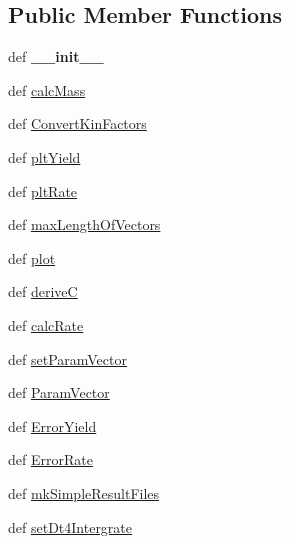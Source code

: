 \subsection*{\-Public \-Member \-Functions}
\begin{DoxyCompactItemize}
\item 
\hypertarget{classModels_1_1ArrheniusModel_aed66810f882bde4a28b94ef527575b4d}{def {\bfseries \-\_\-\-\_\-init\-\_\-\-\_\-}}\label{classModels_1_1ArrheniusModel_aed66810f882bde4a28b94ef527575b4d}

\item 
def \hyperlink{classModels_1_1ArrheniusModel_abb4fedac573a2f263fd5bb4cd284ce65}{calc\-Mass}
\item 
def \hyperlink{classModels_1_1ArrheniusModel_a946e6177077d67613160aaaedde95faa}{\-Convert\-Kin\-Factors}
\item 
def \hyperlink{classModels_1_1Model_a317ed848b969dbe3a96dd05e8b771900}{plt\-Yield}
\item 
def \hyperlink{classModels_1_1Model_aa35c741babf8f141df48c4021e0664e4}{plt\-Rate}
\item 
def \hyperlink{classModels_1_1Model_a3396d6ca1a7b7d66e55ada8c3c7a509e}{max\-Length\-Of\-Vectors}
\item 
def \hyperlink{classModels_1_1Model_ae404a691e48bfe4eafcdfdd09f1dae48}{plot}
\item 
def \hyperlink{classModels_1_1Model_a010945ed2adff59a7a5fce36025e7a97}{derive\-C}
\item 
def \hyperlink{classModels_1_1Model_a7c9280e33f9e0d46703cebc131008c65}{calc\-Rate}
\item 
def \hyperlink{classModels_1_1Model_a818f207e2a4bd0e9a3720ca611960e5a}{set\-Param\-Vector}
\item 
def \hyperlink{classModels_1_1Model_a13c76a0fe24d43cdc4d21fbc73fa96fa}{\-Param\-Vector}
\item 
def \hyperlink{classModels_1_1Model_ad3e627980d9e781bf7b2c9ff900ca06b}{\-Error\-Yield}
\item 
def \hyperlink{classModels_1_1Model_a3050eb39341f318d8d88b172f88bd240}{\-Error\-Rate}
\item 
def \hyperlink{classModels_1_1Model_adcb987bccae63a742490ea1e6d5f7a74}{mk\-Simple\-Result\-Files}
\item 
def \hyperlink{classModels_1_1Model_ac28252ae5cd6b5ecd4c5d006a0e6567d}{set\-Dt4\-Intergrate}
\end{DoxyCompactItemize}
